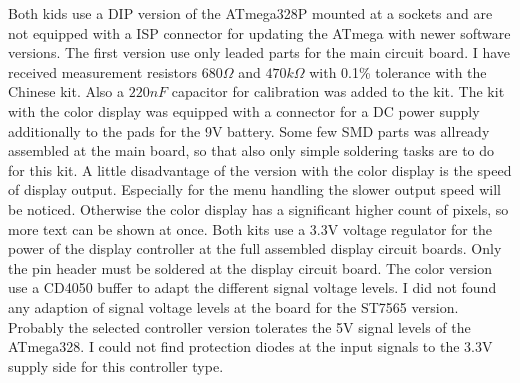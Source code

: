 Both kids use a DIP version of the ATmega328P mounted at a sockets and are
not equipped with a ISP connector for updating the ATmega with newer software versions.
The first version use
only leaded parts for the main circuit board. 
I have received measurement resistors \(680\Omega\) and \(470k\Omega\) with 0.1\% tolerance
with the Chinese kit. Also a \(220 nF\) capacitor for calibration was added
to the kit.
The kit with the color display was equipped with a connector for a DC power supply additionally
to the pads for the 9V battery.
Some few SMD parts was allready assembled at the main board, so that also only simple soldering
tasks are to do for this kit. 
A little disadvantage of the version with the color display is the speed of display output.
Especially for the menu handling the slower output speed will be noticed.
Otherwise the color display has a significant higher count of pixels, so more text can be shown at once.
Both kits use a 3.3V voltage regulator for the power of the display controller at the
full assembled display circuit boards.
Only the pin header must be soldered at the display circuit board.
The color version use a CD4050 buffer to adapt the different signal voltage levels.
I did not found any adaption of signal voltage levels at the board for the ST7565 version.
Probably the selected controller version tolerates the 5V signal levels of the ATmega328.
I could not find protection diodes at the input signals to the 3.3V supply side for this controller type.
\vspace*{-1em}
